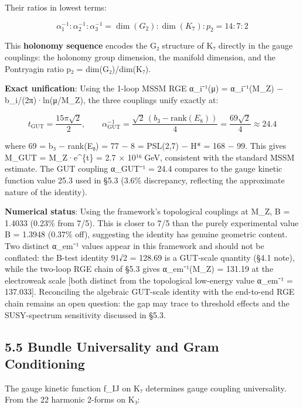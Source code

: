 \documentclass[11pt,a4paper]{article}
\begin{document}
Their ratios in lowest terms:

\[\alpha_1^{-1} : \alpha_2^{-1} : \alpha_3^{-1} = \dim(G_2) : \dim(K_7) : p_2 = 14 : 7 : 2\]

This \textbf{holonomy sequence} encodes the G₂ structure of K₇ directly in the gauge couplings: the holonomy group dimension, the manifold dimension, and the Pontryagin ratio p₂ = dim(G₂)/dim(K₇).

\textbf{Exact unification}: Using the 1-loop MSSM RGE α\_\allowbreak{}i⁻¹(μ) = α\_\allowbreak{}i⁻¹(M\_\allowbreak{}Z) − b\_\allowbreak{}i/(2π)·ln(μ/M\_\allowbreak{}Z), the three couplings unify exactly at:

\[t_{\mathrm{GUT}} = \frac{15\pi\sqrt{2}}{2}, \qquad \alpha_{\mathrm{GUT}}^{-1} = \frac{\sqrt{2}\,(b_3 - \mathrm{rank}(E_8))}{4} = \frac{69\sqrt{2}}{4} \approx 24.4\]

where 69 = b₃ − rank(E₈) = 77 − 8 = \textbar PSL(2,7)\textbar{} − H* = 168 − 99. This gives M\_\allowbreak{}GUT = M\_\allowbreak{}Z·e\^{}\{t\} = 2.7 × 10¹⁶ GeV, consistent with the standard MSSM estimate. The GUT coupling α\_\allowbreak{}GUT⁻¹ = 24.4 compares to the gauge kinetic function value 25.3 used in §5.3 (3.6\% discrepancy, reflecting the approximate nature of the identity).

\textbf{Numerical status}: Using the framework's topological couplings at M\_\allowbreak{}Z, B = 1.4033 (0.23\% from 7/5). This is closer to 7/5 than the purely experimental value B = 1.3948 (0.37\% off), suggesting the identity has genuine geometric content. Two distinct α\_\allowbreak{}em⁻¹ values appear in this framework and should not be conflated: the B-test identity 91√2 = 128.69 is a GUT-scale quantity (§4.1 note), while the two-loop RGE chain of §5.3 gives α\_\allowbreak{}em⁻¹(M\_\allowbreak{}Z) = 131.19 at the electroweak scale {[}both distinct from the topological low-energy value α\_\allowbreak{}em⁻¹ = 137.033{]}. Reconciling the algebraic GUT-scale identity with the end-to-end RGE chain remains an open question: the gap may trace to threshold effects and the SUSY-spectrum sensitivity discussed in §5.3.

\subsection{5.5 Bundle Universality and Gram Conditioning}\label{bundle-universality-and-gram-conditioning}

The gauge kinetic function f\_\allowbreak{}IJ on K₇ determines gauge coupling universality. From the 22 harmonic 2-forms on K₃:
\end{document}

